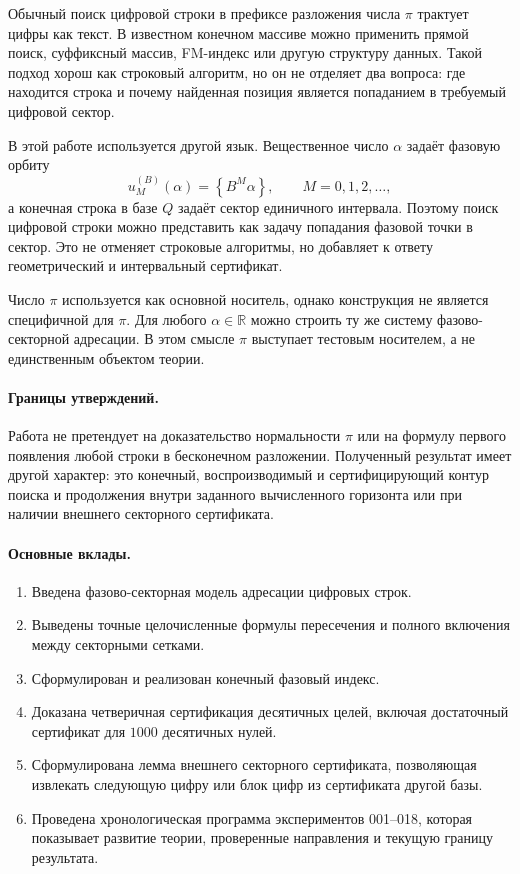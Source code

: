 \documentclass[11pt,a4paper]{article}
\newcommand{\fracpart}[1]{\left\{#1\right\}}
\newcommand{\R}{\mathbb{R}}
\begin{document}
Обычный поиск цифровой строки в префиксе разложения числа $\pi$ трактует цифры как текст.  В известном конечном массиве можно применить прямой поиск, суффиксный массив, FM-индекс или другую структуру данных.  Такой подход хорош как строковый алгоритм, но он не отделяет два вопроса: где находится строка и почему найденная позиция является попаданием в требуемый цифровой сектор.

В этой работе используется другой язык.  Вещественное число $\alpha$ задаёт фазовую орбиту
\[
  u_M^{(B)}(\alpha)=\fracpart{B^M\alpha},\qquad M=0,1,2,\dots,
\]
а конечная строка в базе $Q$ задаёт сектор единичного интервала.  Поэтому поиск цифровой строки можно представить как задачу попадания фазовой точки в сектор.  Это не отменяет строковые алгоритмы, но добавляет к ответу геометрический и интервальный сертификат.

Число $\pi$ используется как основной носитель, однако конструкция не является специфичной для $\pi$.  Для любого $\alpha\in\R$ можно строить ту же систему фазово-секторной адресации.  В этом смысле $\pi$ выступает тестовым носителем, а не единственным объектом теории.

\paragraph{Границы утверждений.}  Работа не претендует на доказательство нормальности $\pi$ или на формулу первого появления любой строки в бесконечном разложении.  Полученный результат имеет другой характер: это конечный, воспроизводимый и сертифицирующий контур поиска и продолжения внутри заданного вычисленного горизонта или при наличии внешнего секторного сертификата.

\paragraph{Основные вклады.}
\begin{enumerate}[leftmargin=2em]
  \item Введена фазово-секторная модель адресации цифровых строк.
  \item Выведены точные целочисленные формулы пересечения и полного включения между секторными сетками.
  \item Сформулирован и реализован конечный фазовый индекс.
  \item Доказана четверичная сертификация десятичных целей, включая достаточный сертификат для $1000$ десятичных нулей.
  \item Сформулирована лемма внешнего секторного сертификата, позволяющая извлекать следующую цифру или блок цифр из сертификата другой базы.
  \item Проведена хронологическая программа экспериментов 001--018, которая показывает развитие теории, проверенные направления и текущую границу результата.
\end{enumerate}
\end{document}
